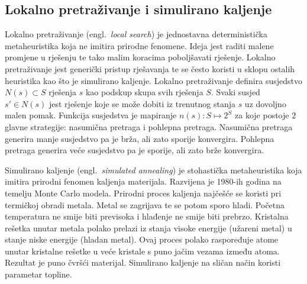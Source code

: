 \documentclass[times, utf8, diplomski]{fer}
\begin{document}
\subsection{Lokalno pretraživanje i simulirano kaljenje}

Lokalno pretraživanje (engl.~\textit{local search}) je jednostavna deterministička metaheuristika koja ne imitira prirodne fenomene. Ideja jest raditi malene promjene u rješenju te tako malim koracima poboljšavati rješenje. Lokalno pretraživanje jest generički pristup rješavanja te se često koristi u sklopu ostalih heuristika kao što je simulirano kaljenje. Lokalno pretraživanje definira susjedstvo $N(s) \subset S$ rješenja $s$ kao podskup skupa svih rješenja $S$. Svaki susjed $s' \in N(s)$ jest rješenje koje se može dobiti iz trenutnog stanja $s$ uz dovoljno malen pomak. Funkcija susjedstva je mapiranje $n(s): S \mapsto 2^{S}$ za koje postoje $2$ glavne strategije: nasumična pretraga i pohlepna pretraga. Nasumična pretraga generira manje susjedstvo pa je brža, ali zato sporije konvergira. Pohlepna pretraga generira veće susjedstvo pa je sporije, ali zato brže konvergira.

Simulirano kaljenje (engl.~\textit{simulated annealing}) je stohastička metaheuristika koja imitira prirodni fenomen kaljenja materijala. Razvijena je 1980-ih godina na temelju Monte Carlo modela. Prirodni proces kaljenja najčešće se koristi pri termičkoj obradi metala. Metal se zagrijava te se potom sporo hladi. Početna temperatura ne smije biti previsoka i hlađenje ne smije biti prebrzo. Kristalna rešetka unutar metala polako prelazi iz stanja visoke energije (užareni metal) u stanje niske energije (hladan metal). Ovaj proces polako raspoređuje atome unutar kristalne rešetke u veće kristale s puno jačim vezama između atoma. Rezultat je puno čvršći materijal. Simulirano kaljenje na sličan način koristi parametar topline.
\end{document}
